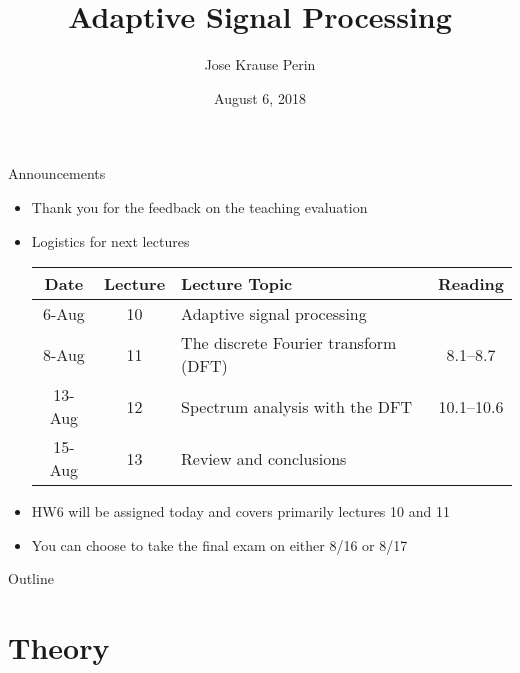 \documentclass[10pt, aspectratio=169]{beamer}
\title[EE 264]{Adaptive Signal Processing}
\author{Jose Krause Perin}
\institute{Stanford University}
\date{August 6, 2018}
\begin{document}
\begin{frame}
  \titlepage
\end{frame}

\begin{frame}{Announcements}
	\begin{itemize}
		\item Thank you for the feedback on the teaching evaluation
		\item Logistics for next lectures
		\vspace{0.2cm}
		\begin{center}
			\begin{tabular}{c|c|l|c}
				\hline
				Date & Lecture	& Lecture Topic	& Reading \\
				\hline
				6-Aug	& 10 & 	Adaptive signal processing &  \\
				8-Aug	& 11 & 	The discrete Fourier transform (DFT) & 8.1--8.7 \\
				\hline
				13-Aug	& 12 & 	Spectrum analysis with the DFT	& 10.1--10.6 \\
				15-Aug	& 13 & 	Review and conclusions & \\
				\hline
			\end{tabular}
		\end{center}
		\vspace{0.2cm}
		\item HW6 will be assigned today and covers primarily lectures 10 and 11
		\item You can choose to take the final exam on either 8/16 or 8/17
	\end{itemize}
\end{frame}

\begin{frame}{Outline}
\tableofcontents
\end{frame}

%
\section{Theory}
\end{document}
